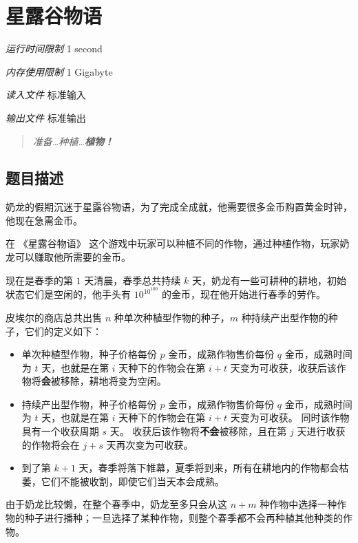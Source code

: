 \section[I. 星露谷物语]{ 星露谷物语}

\textit{运行时间限制}   1 second

\textit{内存使用限制} 1 Gigabyte

\textit{读入文件} \qquad 标准输入

\textit{输出文件} \qquad 标准输出


\begin{quote}
	\textit{准备\ldots 种植\ldots \textbf{植物！}}
\end{quote}

\subsection{题目描述}

奶龙的假期沉迷于星露谷物语，为了完成全成就，他需要很多金币购置黄金时钟，他现在急需金币。

在 《星露谷物语》 这个游戏中玩家可以种植不同的作物，通过种植作物，玩家奶龙可以赚取他所需要的金币。

现在是春季的第 $1$ 天清晨，春季总共持续 $k$ 天，奶龙有一些可耕种的耕地，初始状态它们是空闲的，他手头有 $10^{10^{100}}$ 的金币，现在他开始进行春季的劳作。

皮埃尔的商店总共出售 $n$ 种单次种植型作物的种子，$m$ 种持续产出型作物的种子，它们的定义如下：

\begin{itemize}
	\item 单次种植型作物，种子价格每份 $p$ 金币，成熟作物售价每份 $q$ 金币，成熟时间为 $t$ 天，也就是在第 $i$ 天种下的作物会在第 $i + t$ 天变为可收获，收获后该作物将\textbf{会}被移除，耕地将变为空闲。
	\item 持续产出型作物，种子价格每份 $p$ 金币，成熟作物售价每份 $q$ 金币，成熟时间为 $t$ 天，也就是在第 $i$ 天种下的作物会在第 $i + t$ 天变为可收获。 同时该作物具有一个收获周期 $s$ 天。 收获后该作物将\textbf{不会}被移除，且在第 $j$ 天进行收获的作物将会在 $j + s$ 天再次变为可收获。
	\item 到了第 $k + 1$ 天，春季将落下帷幕，夏季将到来，所有在耕地内的作物都会枯萎，它们不能被收割，即使它们当天本会成熟。
\end{itemize}



由于奶龙比较懒，在整个春季中，奶龙至多只会从这 $n + m$ 种作物中选择一种作物的种子进行播种；一旦选择了某种作物，则整个春季都不会再种植其他种类的作物。

